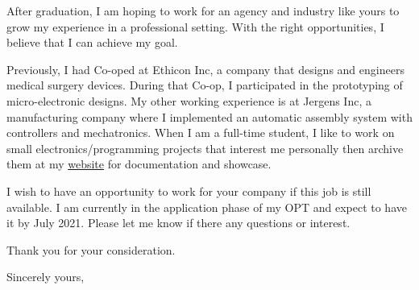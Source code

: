\documentclass[11pt]{letter} %
\begin{document}
\begin{letter}
\par After graduation, I am hoping to work for an agency and industry like yours to grow my experience in a professional setting.
With the right opportunities, I believe that I can achieve my goal.

\par Previously, I had Co-oped at Ethicon Inc, a company that designs and engineers medical surgery devices.
During that Co-op, I participated in the prototyping of micro-electronic designs.
My other working experience is at Jergens Inc, a manufacturing company where I implemented an automatic assembly system with controllers and mechatronics.
When I am a full-time student, I like to work on small electronics/programming projects that interest me personally then archive them at my \href{https://liu2z2.github.io/tags#project-ref}{website} for documentation and showcase.

\par I wish to have an opportunity to work for your company if this job is still available.
I am currently in the application phase of my OPT and expect to have it by July 2021.
Please let me know if there any questions or interest.

\par Thank you for your consideration.

\closing{Sincerely yours,}




\end{letter}
\end{document}
